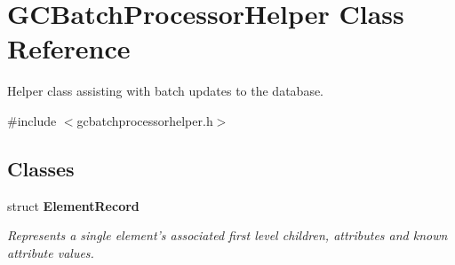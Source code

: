 \hypertarget{class_g_c_batch_processor_helper}{\section{\-G\-C\-Batch\-Processor\-Helper \-Class \-Reference}
\label{class_g_c_batch_processor_helper}
}


\-Helper class assisting with batch updates to the database.  




{\ttfamily \#include $<$gcbatchprocessorhelper.\-h$>$}

\subsection*{\-Classes}
\begin{DoxyCompactItemize}
\item 
struct {\bfseries \-Element\-Record}
\begin{DoxyCompactList}\small\item\em \-Represents a single element's associated first level children, attributes and known attribute values. \end{DoxyCompactList}\end{DoxyCompactItemize}
